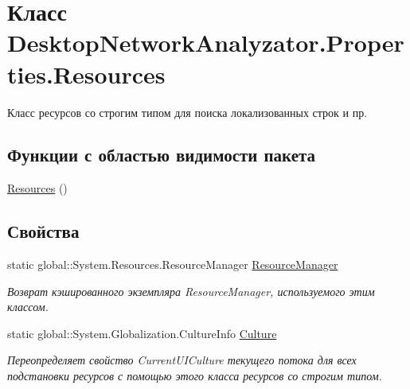 \hypertarget{class_desktop_network_analyzator_1_1_properties_1_1_resources}{}\section{Класс Desktop\+Network\+Analyzator.\+Properties.\+Resources}
\label{class_desktop_network_analyzator_1_1_properties_1_1_resources}


Класс ресурсов со строгим типом для поиска локализованных строк и пр.  


\subsection*{Функции с областью видимости пакета}
\begin{DoxyCompactItemize}
\item 
\hyperlink{class_desktop_network_analyzator_1_1_properties_1_1_resources_a1c3715bb1a69bc1084a706a7720b9e79}{Resources} ()
\end{DoxyCompactItemize}
\subsection*{Свойства}
\begin{DoxyCompactItemize}
\item 
static global\+::\+System.\+Resources.\+Resource\+Manager \hyperlink{class_desktop_network_analyzator_1_1_properties_1_1_resources_ae5276cdc8e040a7502e987df90a0461f}{Resource\+Manager}
\begin{DoxyCompactList}\small\item\em Возврат кэшированного экземпляра Resource\+Manager, используемого этим классом. \end{DoxyCompactList}\item 
static global\+::\+System.\+Globalization.\+Culture\+Info \hyperlink{class_desktop_network_analyzator_1_1_properties_1_1_resources_a0ffd2cedfddbff03a1e4d2d7b7cb42bd}{Culture}
\begin{DoxyCompactList}\small\item\em Переопределяет свойство Current\+U\+I\+Culture текущего потока для всех подстановки ресурсов с помощью этого класса ресурсов со строгим типом. \end{DoxyCompactList}\end{DoxyCompactItemize}

